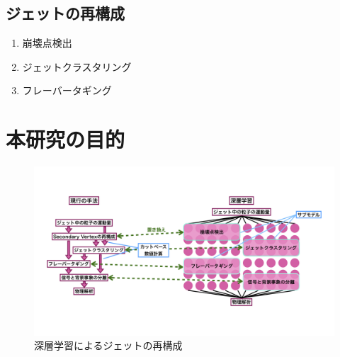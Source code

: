 \subsection{ジェットの再構成} \label{Intro:SoftERILC:JetReconstruction}

\begin{enumerate}
  \item 崩壊点検出
  \item ジェットクラスタリング
  \item フレーバータギング
\end{enumerate}

\section{本研究の目的} \label{Intro:Purpose}

\begin{figure}[h]
 \centering
 \includegraphics[width=1.0\textwidth]{Figure/1Introduction/6JetReconstructionwithDeepLearning.png}
 \caption{深層学習によるジェットの再構成}
 \label{6JetReconstructionwithDeepLearning}
\end{figure}

















